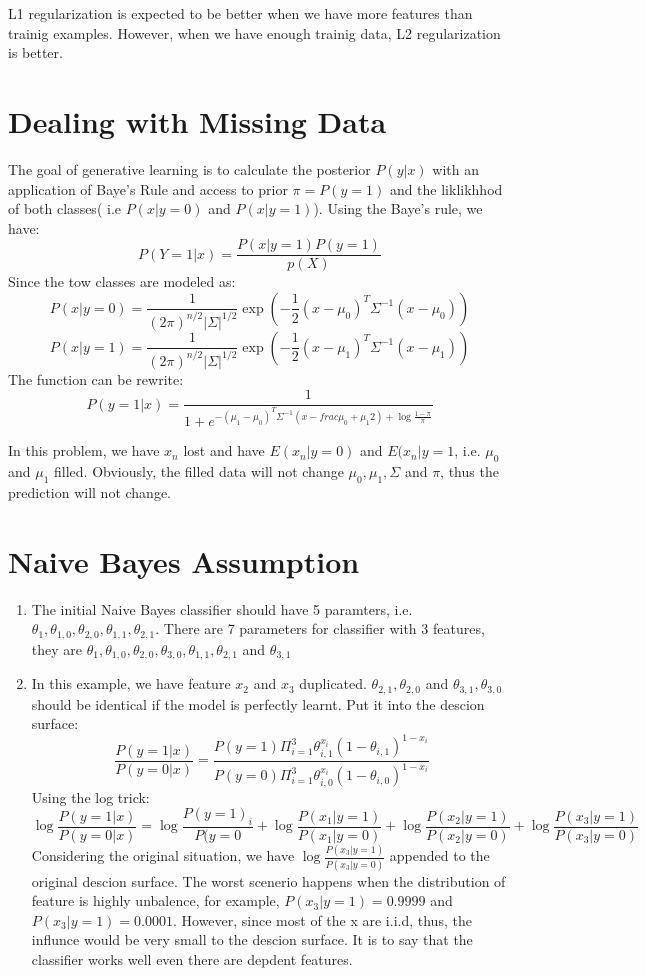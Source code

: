 \documentclass[a4paper, 12pt, titlepage]{article}
\begin{document}
\begin{enumerate}
            L1 regularization is expected to be better when we have more features than trainig examples. However, when we have enough trainig data, L2 regularization is better.
\end{enumerate}

\section{Dealing with Missing Data}

The goal of generative learning is to calculate the posterior $P(y|x)$ with an application of Baye's Rule and access to prior $\pi=P(y=1)$ and the liklikhhod of both classes( i.e $P(x|y=0)$ and $P(x|y=1)$).
Using the Baye's rule, we have:
$$P(Y=1|x) = \frac{P(x|y=1)P(y=1)}{p(X)}$$
Since the tow classes are modeled as:
$$P(x|y=0) = \frac{1}{(2\pi)^{n/2}|\Sigma|^{1/2}}\exp{(-\frac{1}{2}(x-\mu_0)^T\Sigma^{-1}(x-\mu_0))}$$
$$P(x|y=1) = \frac{1}{(2\pi)^{n/2}|\Sigma|^{1/2}}\exp{(-\frac{1}{2}(x-\mu_1)^T\Sigma^{-1}(x-\mu_1))}$$
The function can be rewrite:
$$P(y=1|x) = \frac{1}{1+e^{-(\mu_1-\mu_0)^T\Sigma^{-1}(x-frac{\mu_0+\mu_1}{2})+\log\frac{1-\pi}{\pi}}}$$

In this problem, we have $x_n$ lost and have $E(x_n|y=0)$ and $E(x_n|y=1$, i.e. $\mu_0$ and $\mu_1$ filled. Obviously, the filled data will not change $\mu_0, \mu_1, \Sigma$ and $\pi$, thus the prediction will not change.

\section{Naive Bayes Assumption}

\begin{enumerate}
    \item The initial Naive Bayes classifier should have 5 paramters, i.e. $\theta_1, \theta_{1,0}, \theta_{2, 0}, \theta_{1, 1}, \theta_{2, 1}$. There are 7 parameters for classifier with 3 features, they are $\theta_1, \theta_{1,0}, \theta_{2, 0},\theta_{3, 0}, \theta_{1, 1}, \theta_{2, 1}$ and $\theta_{3, 1}$
    \item In this example, we have feature $x_2$ and $x_3$ duplicated. $\theta_{2,1}, \theta_{2,0}$ and $\theta_{3,1}, \theta_{3,0}$ should be identical if the model is perfectly learnt. Put it into the descion surface:
        $$\frac{P(y=1|x)}{P(y=0|x)}=\frac{P(y=1)\Pi^3_{i=1}\theta^{x_i}_{i,1}(1-\theta_{i,1})^{1-x_i}}{P(y=0)\Pi^3_{i=1}\theta^{x_i}_{i,0}(1-\theta_{i,0})^{1-x_i}}$$
        Using the log trick:
        $$\log{\frac{P(y=1|x)}{P(y=0|x)}}=\log{\frac{P(y=1)_i}{P(y=0}} + \log{\frac{P(x_1|y=1)}{P(x_1|y=0)}}+\log{\frac{P(x_2|y=1)}{P(x_2|y=0)}}+\log{\frac{P(x_3|y=1)}{P(x_3|y=0)}}$$
        Considering the original situation, we have $\log{\frac{P(x_3|y=1)}{P(x_3|y=0)}}$ appended to the original descion surface. The worst scenerio happens when the distribution of feature is highly unbalence, for example, $P(x_3|y=1) = 0.9999$ and $P(x_3|y=1) = 0.0001$. However, since most of the x are i.i.d, thus, the influnce would be very small to the descion surface. It is to say that the classifier works well even there are depdent features.

\end{enumerate}
\end{document}
